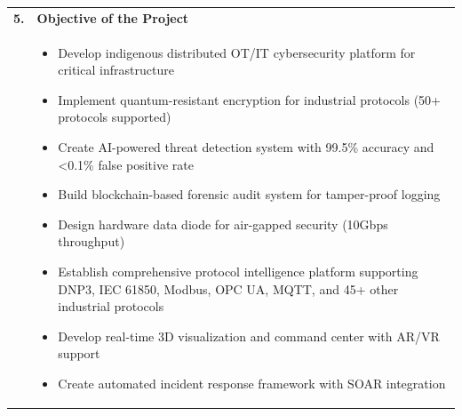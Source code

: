 \documentclass[12pt,a4paper]{article}
\begin{document}
\begin{longtable}{|p{0.5cm}p{3cm}|p{11cm}|}
\multicolumn{2}{|l|}{\textbf{5.}} & \textbf{Objective of the Project} \\
\multicolumn{2}{|l|}{} & 
\begin{itemize}[leftmargin=1em, itemsep=0pt]
    \item Develop indigenous distributed OT/IT cybersecurity platform for critical infrastructure
    \item Implement quantum-resistant encryption for industrial protocols (50+ protocols supported)
    \item Create AI-powered threat detection system with 99.5\% accuracy and <0.1\% false positive rate
    \item Build blockchain-based forensic audit system for tamper-proof logging
    \item Design hardware data diode for air-gapped security (10Gbps throughput)
    \item Establish comprehensive protocol intelligence platform supporting DNP3, IEC 61850, Modbus, OPC UA, MQTT, and 45+ other industrial protocols
    \item Develop real-time 3D visualization and command center with AR/VR support
    \item Create automated incident response framework with SOAR integration
\end{itemize} \\
\hline

\end{longtable}

\newpage
\end{document}
